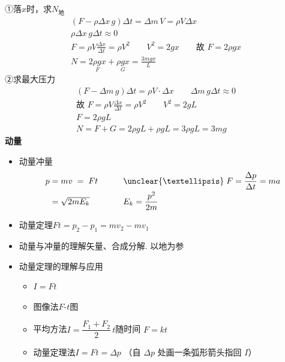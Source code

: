 ①落$x$时，求$N_{\text{地}}$
\begin{gather*}
(F-\rho\Delta x\,g)\Delta t=\Delta m\,V=\rho V\Delta x\\
\rho\Delta x\,g\Delta t\approx0\\
F=\rho V\frac{\Delta x}{\Delta t}=\rho V^2\qquad V^2=2gx\qquad\text{故 }F=2\rho gx\\
N=\underset{F}{2\rho gx}+\underset{G}{\rho gx}=\boxed{\frac{3mgx}{L}} %
\end{gather*}
②求最大压力
\begin{gather*}
(F-\Delta m\,g)\Delta t=\rho V\cdot\Delta x\qquad\Delta m\,g\Delta t\approx0\\
\text{故 }F=\rho V\frac{\Delta x}{\Delta t}=\rho V^2\qquad V^2=2gL\\
F=2\rho gL\\
N=F+G=2\rho gL+\rho gL=3\rho gL=\boxed{3mg} %
\end{gather*}
\textbf{动量}
\begin{itemize}
\item 动量\quad 冲量
  \[
  \begin{array}{ll}
  p=mv\;=\;Ft & \qquad \unclear{…}\;F=\dfrac{\Delta p}{\Delta t}=ma \\[6pt]
  \phantom{p}=\sqrt{2mE_k} & \qquad E_k=\dfrac{p^2}{2m}
  \end{array}
  \]
\item 动量定理\quad $Ft=p_2-p_1=mv_2-mv_1$
\end{itemize}
\begin{itemize}
\item 动量与冲量的理解\quad 矢量、合成分解. 以地为参 %
\item 动量定理的理解与应用
  \begin{itemize}
  \item $I=Ft$
  \item 图像法\quad $F$-$t$图
  \item 平均方法\quad $I=\dfrac{F_1+F_2}{2}\,t$\quad 随时间 $F=kt$
  \item 动量定理法\quad $I=Ft=\Delta p$ （自 $\Delta p$ 处画一条弧形箭头指回 $I$）
  \end{itemize}
\end{itemize}
